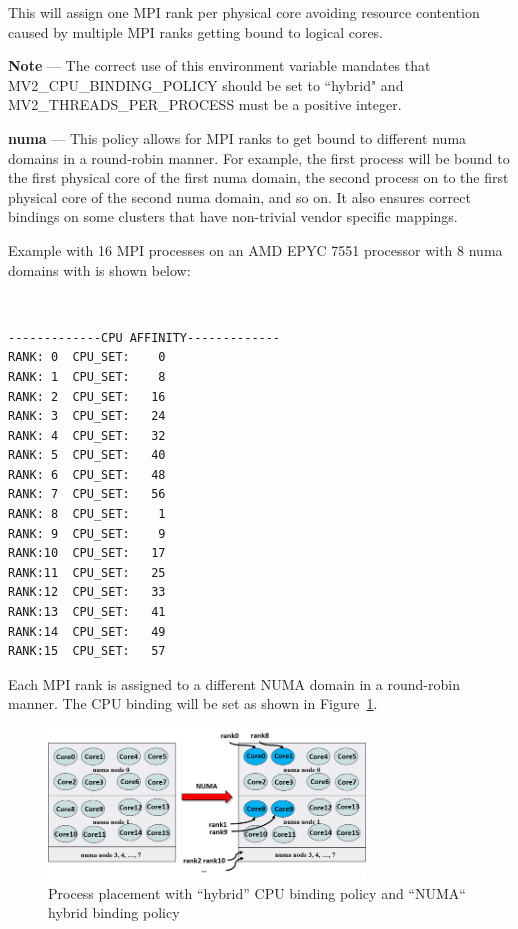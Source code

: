 This will assign one MPI rank per physical core avoiding resource contention 
caused by multiple MPI ranks getting bound to logical cores. 

\textbf{Note} --- The correct use of this environment variable mandates that  \\
MV2\_CPU\_BINDING\_POLICY should be set to ``hybrid" and 
MV2\_THREADS\_PER\_PROCESS must be a positive integer. 


\textbf{numa} --- This policy allows for MPI ranks to get bound to 
different numa domains in a round-robin manner. For example, the first process
will be bound to the first physical core of the first numa domain, the second
process on to the first physical core of the second numa domain, and so on. 
It also ensures correct bindings on some clusters that have non-trivial vendor 
specific mappings.

Example with 16 MPI processes on an AMD EPYC 7551 processor with 8 numa domains 
with is shown below: 

\\

\begin{verbatim}
-------------CPU AFFINITY-------------
RANK: 0  CPU_SET:    0
RANK: 1  CPU_SET:    8
RANK: 2  CPU_SET:   16
RANK: 3  CPU_SET:   24
RANK: 4  CPU_SET:   32
RANK: 5  CPU_SET:   40
RANK: 6  CPU_SET:   48
RANK: 7  CPU_SET:   56
RANK: 8  CPU_SET:    1
RANK: 9  CPU_SET:    9
RANK:10  CPU_SET:   17
RANK:11  CPU_SET:   25
RANK:12  CPU_SET:   33
RANK:13  CPU_SET:   41
RANK:14  CPU_SET:   49
RANK:15  CPU_SET:   57
\end{verbatim}

Each MPI rank is assigned to a different NUMA domain in a round-robin manner. 
The CPU binding will be set as shown in Figure~\ref{fig:numa1}.

\begin{figure}[htbp]
 \centering
 \includegraphics[width=0.75\textwidth]{Img/numa_binding.png}
 \caption{Process placement with ``hybrid'' CPU binding policy and ``NUMA``
          hybrid binding policy}
 \label{fig:numa1}
\end{figure}

